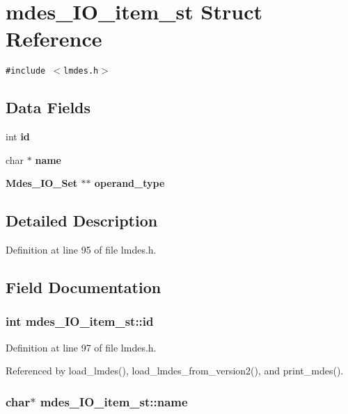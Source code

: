 \section{mdes\_\-IO\_\-item\_\-st Struct Reference}
\label{structmdes__IO__item__st}
{\tt \#include $<$lmdes.h$>$}

\subsection*{Data Fields}
\begin{CompactItemize}
\item 
int \bf{id}
\item 
char $\ast$ \bf{name}
\item 
\bf{Mdes\_\-IO\_\-Set} $\ast$$\ast$ \bf{operand\_\-type}
\end{CompactItemize}


\subsection{Detailed Description}




Definition at line 95 of file lmdes.h.

\subsection{Field Documentation}
\subsubsection{\setlength{\rightskip}{0pt plus 5cm}int \bf{mdes\_\-IO\_\-item\_\-st::id}}\label{structmdes__IO__item__st_7aae29fa0ac0f1ccf9b1da5f510cfe35}




Definition at line 97 of file lmdes.h.

Referenced by load\_\-lmdes(), load\_\-lmdes\_\-from\_\-version2(), and print\_\-mdes().
\subsubsection{\setlength{\rightskip}{0pt plus 5cm}char$\ast$ \bf{mdes\_\-IO\_\-item\_\-st::name}}\label{structmdes__IO__item__st_556ae9017c2be5ad184b004107ea5761}




